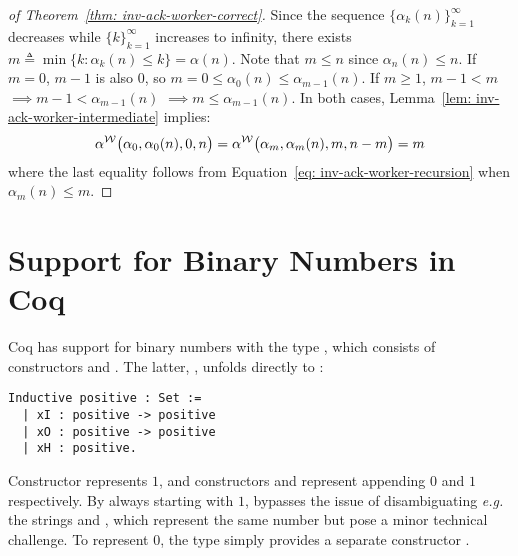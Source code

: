 \begin{proof}[of Theorem~\ref{thm: inv-ack-worker-correct}]
	Since the sequence $\big\{\alpha_k(n)\big\}_{k=1}^{\infty}$ decreases while $\{k\}_{k=1}^{\infty}$ increases to infinity, there exists $m \triangleq \min\big\{k : \alpha_k(n) \le k \} = \alpha(n)$. Note that $m\le n$ since $\alpha_n(n)\le n$.
	If $m = 0$, $m - 1$ is also $0$, so $m = 0 \le \alpha_0(n)\le \alpha_{m-1}(n)$. If $m \ge 1$, $m - 1 < m$ $\implies m - 1 < \alpha_{m-1}(n)$ $\implies m \le \alpha_{m-1}(n)$. In both cases, Lemma~\ref{lem: inv-ack-worker-intermediate} implies:
	$$ \alpha^{\mathcal{W}}\big(\alpha_0, \alpha_0(n), 0, n\big) = \alpha^{\mathcal{W}}\big(\alpha_m, \alpha_m(n), m, n - m\big) = m $$
	where the last equality follows from Equation~\ref{eq: inv-ack-worker-recursion} when $\alpha_m(n)\le m$.
\end{proof}

\section{Support for Binary Numbers in Coq}
\label{apx:bin_in_coq}
Coq has support for binary numbers with the type , which consists
of constructors  and . The latter, , unfolds directly to :

\begin{lstlisting}
Inductive positive : Set :=
  | xI : positive -> positive 
  | xO : positive -> positive
  | xH : positive.
\end{lstlisting}

Constructor  represents $1$, and constructors  and  represent
appending $0$ and $1$ respectively.
By always starting with $1$,  bypasses
the issue of disambiguating \emph{e.g.} the strings  and
, which represent the same number but pose
a minor technical challenge.
To represent $0$, the type  simply provides a separate constructor .

